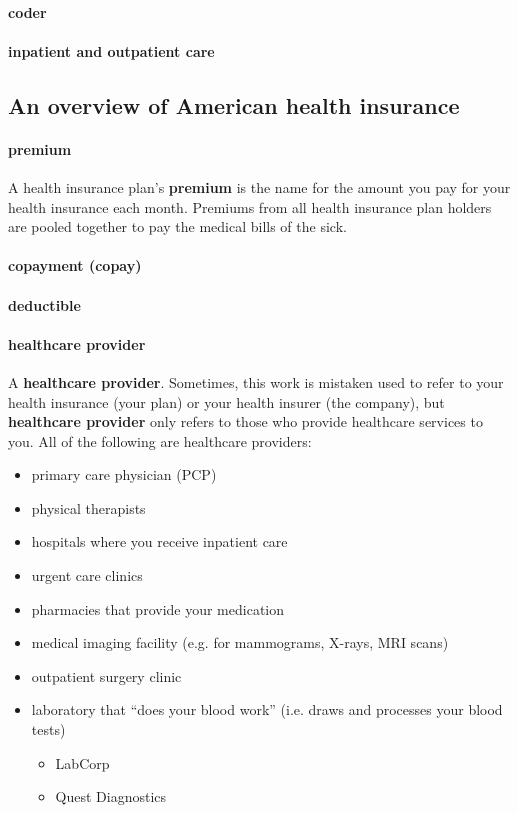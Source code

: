\documentclass{article}
\begin{document}
\paragraph{coder}

\paragraph{inpatient and outpatient care}

\subsection{An overview of American health insurance}

\paragraph{premium} A health insurance plan's {\bf premium} is the name for the amount you pay for your health insurance each month. Premiums from all health insurance plan holders are pooled together to pay the medical bills of the sick.

\paragraph{copayment (copay)}

\paragraph{deductible}

\paragraph{healthcare provider} A {\bf healthcare provider}. Sometimes, this work is mistaken used to refer to your health insurance (your plan) or your health insurer (the company), but {\bf healthcare provider} only refers to those who provide healthcare services to you. All of the following are healthcare providers:

\begin{itemize}
\item primary care physician (PCP)
\item physical therapists
\item hospitals where you receive inpatient care
\item urgent care clinics
\item pharmacies that provide your medication
\item medical imaging facility (e.g. for mammograms, X-rays, MRI scans)
\item outpatient surgery clinic
\item laboratory that ``does your blood work'' (i.e. draws and processes your blood tests)
  \begin{itemize}
    \item LabCorp
    \item Quest Diagnostics
  \end{itemize}
\end{itemize}
\end{document}
